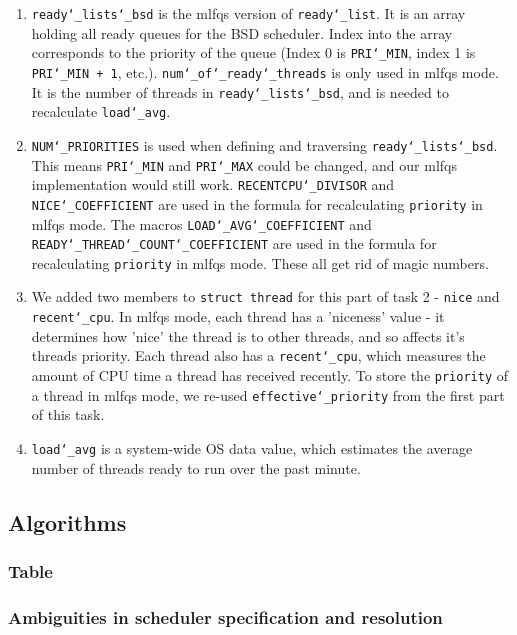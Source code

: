 \documentclass{article}
\renewcommand{\_}{\char`_}
\begin{document}
\begin{enumerate}

\item \texttt{ready\_lists\_bsd} is the mlfqs version of \texttt{ready\_list}. It is an array holding all ready queues for the BSD scheduler. Index into the array corresponds to the priority of the queue (Index 0 is \texttt{PRI\_MIN}, index 1 is \texttt{PRI\_MIN + 1}, etc.). \texttt{num\_of\_ready\_threads} is only used in mlfqs mode. It is the number of threads in \texttt{ready\_lists\_bsd}, and is needed to recalculate \texttt{load\_avg}.

\item \texttt{NUM\_PRIORITIES} is used when defining and traversing \texttt{ready\_lists\_bsd}. This means \texttt{PRI\_MIN} and \texttt{PRI\_MAX} could be changed, and our mlfqs implementation would still work. \texttt{RECENTCPU\_DIVISOR} and \texttt{NICE\_COEFFICIENT} are used in the formula for recalculating \texttt{priority} in mlfqs mode. The macros \texttt{LOAD\_AVG\_COEFFICIENT} and \texttt{READY\_THREAD\_COUNT\_COEFFICIENT} are used in the formula for recalculating \texttt{priority} in mlfqs mode. These all get rid of magic numbers.

\item We added two members to \texttt{struct thread} for this part of task 2 - \texttt{nice} and \texttt{recent\_cpu}. In mlfqs mode, each thread has a 'niceness' value - it determines how 'nice' the thread is to other threads, and so affects it's threads priority. Each thread also has a \texttt{recent\_cpu}, which measures the amount of CPU time a thread has received recently. To store the \texttt{priority} of a thread in mlfqs mode, we re-used \texttt{effective\_priority} from the first part of this task.

\item \texttt{load\_avg} is a system-wide OS data value, which estimates the average number of threads ready to run over the past minute.

\end{enumerate}

\subsection{Algorithms}
\subsubsection{Table}
\subsubsection{Ambiguities in scheduler specification and resolution}
\end{document}
